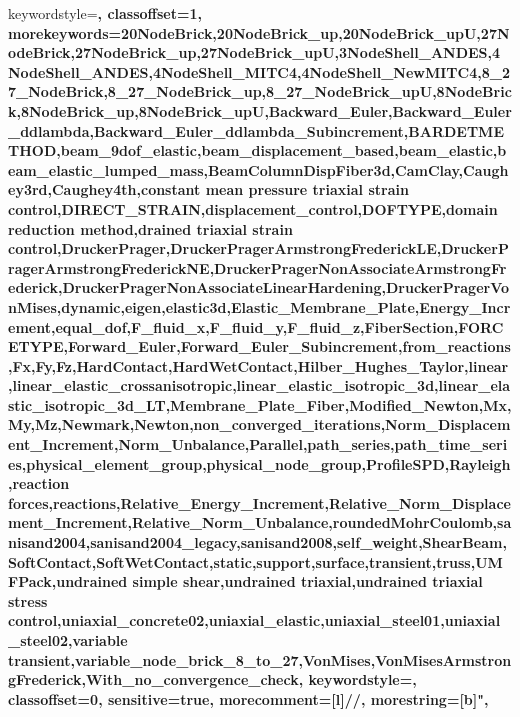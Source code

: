 {keywordstyle=\color{blue}\bfseries,
classoffset=1,
morekeywords={20NodeBrick,20NodeBrick_up,20NodeBrick_upU,27NodeBrick,27NodeBrick_up,27NodeBrick_upU,3NodeShell_ANDES,4NodeShell_ANDES,4NodeShell_MITC4,4NodeShell_NewMITC4,8_27_NodeBrick,8_27_NodeBrick_up,8_27_NodeBrick_upU,8NodeBrick,8NodeBrick_up,8NodeBrick_upU,Backward_Euler,Backward_Euler_ddlambda,Backward_Euler_ddlambda_Subincrement,BARDETMETHOD,beam_9dof_elastic,beam_displacement_based,beam_elastic,beam_elastic_lumped_mass,BeamColumnDispFiber3d,CamClay,Caughey3rd,Caughey4th,constant mean pressure triaxial strain control,DIRECT_STRAIN,displacement_control,DOFTYPE,domain reduction method,drained triaxial strain control,DruckerPrager,DruckerPragerArmstrongFrederickLE,DruckerPragerArmstrongFrederickNE,DruckerPragerNonAssociateArmstrongFrederick,DruckerPragerNonAssociateLinearHardening,DruckerPragerVonMises,dynamic,eigen,elastic3d,Elastic_Membrane_Plate,Energy_Increment,equal_dof,F_fluid_x,F_fluid_y,F_fluid_z,FiberSection,FORCETYPE,Forward_Euler,Forward_Euler_Subincrement,from_reactions,Fx,Fy,Fz,HardContact,HardWetContact,Hilber_Hughes_Taylor,linear,linear_elastic_crossanisotropic,linear_elastic_isotropic_3d,linear_elastic_isotropic_3d_LT,Membrane_Plate_Fiber,Modified_Newton,Mx,My,Mz,Newmark,Newton,non_converged_iterations,Norm_Displacement_Increment,Norm_Unbalance,Parallel,path_series,path_time_series,physical_element_group,physical_node_group,ProfileSPD,Rayleigh,reaction forces,reactions,Relative_Energy_Increment,Relative_Norm_Displacement_Increment,Relative_Norm_Unbalance,roundedMohrCoulomb,sanisand2004,sanisand2004_legacy,sanisand2008,self_weight,ShearBeam,SoftContact,SoftWetContact,static,support,surface,transient,truss,UMFPack,undrained simple shear,undrained triaxial,undrained triaxial stress control,uniaxial_concrete02,uniaxial_elastic,uniaxial_steel01,uniaxial_steel02,variable transient,variable_node_brick_8_to_27,VonMises,VonMisesArmstrongFrederick,With_no_convergence_check},
keywordstyle=\color{red}\bfseries,
classoffset=0,
sensitive=true,
morecomment=[l]{//},
morestring=[b]",
}



 